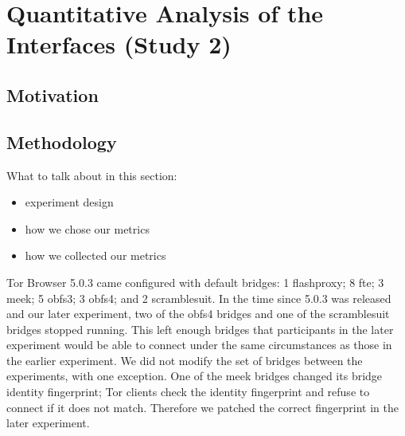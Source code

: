 \documentclass{template}
\begin{document}
\section{Quantitative Analysis of the Interfaces (Study 2)}

\subsection{Motivation} 

\subsection{Methodology} 
{\color {red} 
What to talk about in this section: 
\begin{itemize} \itemsep1pt \parskip0pt  
\item experiment design
\item how we chose our metrics
\item how we collected our metrics
\end{itemize} 
}

Tor Browser 5.0.3 came configured with default bridges:
1 flashproxy;
8 fte;
3 meek;
5 obfs3;
3 obfs4;
and 2 scramblesuit.
In the time since 5.0.3 was released and our later experiment,
two of the obfs4 bridges and one of the scramblesuit bridges stopped running.
This left enough bridges that participants in the later experiment would be able to connect
under the same circumstances as those in the earlier experiment.
We did not modify the set of bridges between the experiments,
with one exception.
One of the meek bridges changed its bridge identity fingerprint;
Tor clients check the identity fingerprint and refuse to connect
if it does not match.
Therefore we patched the correct fingerprint in the later experiment.
\end{document}
